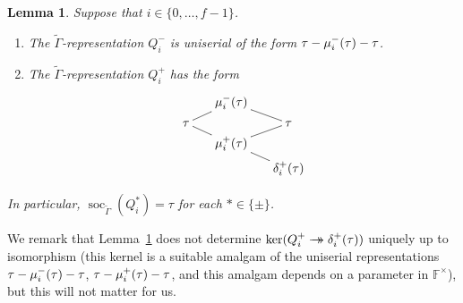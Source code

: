 \documentclass[JEP,XML,SOM,Unicode,NoFloatCountersInSection, NoEqCountersInSection,published]{cedram}
\newcommand{\onto}{\mathchoice{\to\hspace*{-5mm}\to}{\mathrel{\hbox{$\to\hspace*{-2.85mm}\to$}}}{\to\hspace*{-3mm}\to}{\to\hspace*{-3mm}\to}}
\let\wt\widetilde
\newcommand{\F}{\mathbb{F}}
\DeclareMathOperator{\soc}{soc}
\theoremstyle{plain}
\newtheorem{lem}[prop]{Lemma}
\theoremstyle{definition}
\begin{document}
\begin{lem}\label{lem:reps-Qi*}
Suppose that $i \in \{0,\dots,f-1\}$.
\begin{enumerate}
\item\label{lem:reps-Qi*i} The $\wt\Gamma$-representation $Q_i^-$ is uniserial of the form $\tau \-- \mu_i^-(\tau) \-- \tau$.
\item\label{lem:reps-Qi*ii} The $\wt\Gamma$-representation $Q_i^+$ has the form
\begin{equation*}
\xymatrix@R=.1cm@C=.5cm{
& \mu_i^-(\tau) \ar@{-}[rd]\\
\tau \ar@{-}[rd]\ar@{-}[ru] && \tau \\
& \mu_i^+(\tau) \ar@{-}[rd]\ar@{-}[ru]\\
&& \delta_i^+(\tau)}
\end{equation*}
\end{enumerate}
In particular, $\soc_{\wt\Gamma}(Q_i^*)=\tau$ for each $* \in \{\pm\}$.
\end{lem}

We remark that Lemma~\ref{lem:reps-Qi*} does not determine $\ker(Q_i^+ \onto \delta_i^+(\tau))$ uniquely up to isomorphism (this kernel is a suitable amalgam of the uniserial representations $\tau \-- \mu_i^-(\tau) \-- \tau$, $\tau \-- \mu_i^+(\tau) \-- \tau$, and this amalgam depends on a parameter in $\F^\times$), but this will not matter for us.
\end{document}
